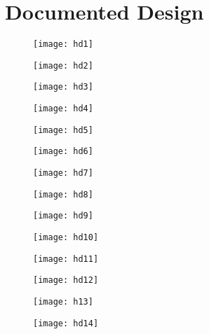 \documentclass{article}
\begin{document}
\section{Documented Design}
\begin{figure}[ht]
    \centering
    \texttt{[image: hd1]}
    \caption{}
\end{figure}
\begin{figure}[ht]
    \centering
    \texttt{[image: hd2]}
    \caption{}
\end{figure}
\begin{figure}[ht]
    \centering
    \texttt{[image: hd3]}
    \caption{}
\end{figure}
\begin{figure}[ht]
    \centering
    \texttt{[image: hd4]}
    \caption{}
\end{figure}
\begin{figure}[ht]
    \centering
    \texttt{[image: hd5]}
    \caption{}
\end{figure}
\clearpage
\begin{figure}[ht]
    \centering
    \texttt{[image: hd6]}
    \caption{}
\end{figure}
\begin{figure}[ht]
    \centering
    \texttt{[image: hd7]}
    \caption{}
\end{figure}
\begin{figure}[ht]
    \centering
    \texttt{[image: hd8]}
    \caption{}
\end{figure}
\begin{figure}[ht]
    \centering
    \texttt{[image: hd9]}
    \caption{}
\end{figure}
\begin{figure}[ht]
    \centering
    \texttt{[image: hd10]}
    \caption{}
\end{figure}
\begin{figure}[ht]
    \centering
    \texttt{[image: hd11]}
    \caption{}
\end{figure}
\begin{figure}[ht]
    \centering
    \texttt{[image: hd12]}
    \caption{}
\end{figure}
\begin{figure}[ht]
    \centering
    \texttt{[image: h13]}
    \caption{}
\end{figure}
\begin{figure}[ht]
    \centering
    \texttt{[image: hd14]}
    \caption{}
\end{figure}
\end{document}
